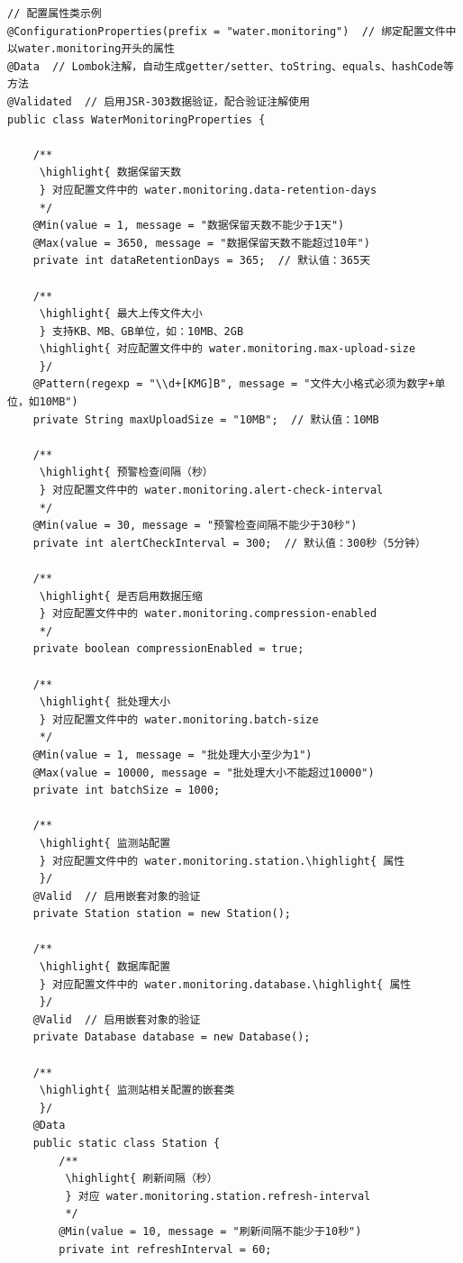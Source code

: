 \begin{lstlisting}[style=java]
// 配置属性类示例
@ConfigurationProperties(prefix = "water.monitoring")  // 绑定配置文件中以water.monitoring开头的属性
@Data  // Lombok注解，自动生成getter/setter、toString、equals、hashCode等方法
@Validated  // 启用JSR-303数据验证，配合验证注解使用
public class WaterMonitoringProperties {
    
    /**
     \highlight{ 数据保留天数
     } 对应配置文件中的 water.monitoring.data-retention-days
     */
    @Min(value = 1, message = "数据保留天数不能少于1天")
    @Max(value = 3650, message = "数据保留天数不能超过10年")
    private int dataRetentionDays = 365;  // 默认值：365天
    
    /**
     \highlight{ 最大上传文件大小
     } 支持KB、MB、GB单位，如：10MB、2GB
     \highlight{ 对应配置文件中的 water.monitoring.max-upload-size
     }/
    @Pattern(regexp = "\\d+[KMG]B", message = "文件大小格式必须为数字+单位，如10MB")
    private String maxUploadSize = "10MB";  // 默认值：10MB
    
    /**
     \highlight{ 预警检查间隔（秒）
     } 对应配置文件中的 water.monitoring.alert-check-interval
     */
    @Min(value = 30, message = "预警检查间隔不能少于30秒")
    private int alertCheckInterval = 300;  // 默认值：300秒（5分钟）
    
    /**
     \highlight{ 是否启用数据压缩
     } 对应配置文件中的 water.monitoring.compression-enabled
     */
    private boolean compressionEnabled = true;
    
    /**
     \highlight{ 批处理大小
     } 对应配置文件中的 water.monitoring.batch-size
     */
    @Min(value = 1, message = "批处理大小至少为1")
    @Max(value = 10000, message = "批处理大小不能超过10000")
    private int batchSize = 1000;
    
    /**
     \highlight{ 监测站配置
     } 对应配置文件中的 water.monitoring.station.\highlight{ 属性
     }/
    @Valid  // 启用嵌套对象的验证
    private Station station = new Station();
    
    /**
     \highlight{ 数据库配置
     } 对应配置文件中的 water.monitoring.database.\highlight{ 属性
     }/
    @Valid  // 启用嵌套对象的验证
    private Database database = new Database();
    
    /**
     \highlight{ 监测站相关配置的嵌套类
     }/
    @Data
    public static class Station {
        /**
         \highlight{ 刷新间隔（秒）
         } 对应 water.monitoring.station.refresh-interval
         */
        @Min(value = 10, message = "刷新间隔不能少于10秒")
        private int refreshInterval = 60;
        

\end{lstlisting}

